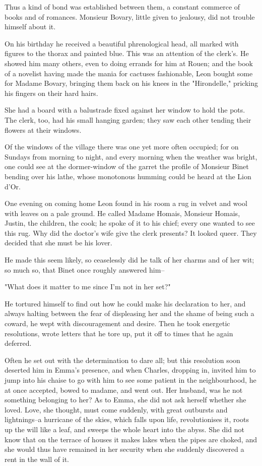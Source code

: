 \documentclass[11pt,twocolumn]{ltugboat}
\begin{document}
Thus a kind of bond was established between them, a constant commerce
of books and of romances. Monsieur Bovary, little given to jealousy, did
not trouble himself about it.

On his birthday he received a beautiful phrenological head, all marked
with figures to the thorax and painted blue. This was an attention of
the clerk's. He showed him many others, even to doing errands for him
at Rouen; and the book of a novelist having made the mania for cactuses
fashionable, Leon bought some for Madame Bovary, bringing them back on
his knees in the "Hirondelle," pricking his fingers on their hard hairs.

She had a board with a balustrade fixed against her window to hold the
pots. The clerk, too, had his small hanging garden; they saw each other
tending their flowers at their windows.

Of the windows of the village there was one yet more often occupied; for
on Sundays from morning to night, and every morning when the weather was
bright, one could see at the dormer-window of the garret the profile of
Monsieur Binet bending over his lathe, whose monotonous humming could be
heard at the Lion d'Or.

One evening on coming home Leon found in his room a rug in velvet and
wool with leaves on a pale ground. He called Madame Homais, Monsieur
Homais, Justin, the children, the cook; he spoke of it to his chief;
every one wanted to see this rug. Why did the doctor's wife give the
clerk presents? It looked queer. They decided that she must be his
lover.

He made this seem likely, so ceaselessly did he talk of her charms and
of her wit; so much so, that Binet once roughly answered him--

"What does it matter to me since I'm not in her set?"

He tortured himself to find out how he could make his declaration to
her, and always halting between the fear of displeasing her and the
shame of being such a coward, he wept with discouragement and desire.
Then he took energetic resolutions, wrote letters that he tore up, put
it off to times that he again deferred.

Often he set out with the determination to dare all; but this resolution
soon deserted him in Emma's presence, and when Charles, dropping in,
invited him to jump into his chaise to go with him to see some patient
in the neighbourhood, he at once accepted, bowed to madame, and went
out. Her husband, was he not something belonging to her? As to Emma,
she did not ask herself whether she loved. Love, she thought, must come
suddenly, with great outbursts and lightnings--a hurricane of the skies,
which falls upon life, revolutionises it, roots up the will like a leaf,
and sweeps the whole heart into the abyss. She did not know that on
the terrace of houses it makes lakes when the pipes are choked, and she
would thus have remained in her security when she suddenly discovered a
rent in the wall of it.
\end{document}
